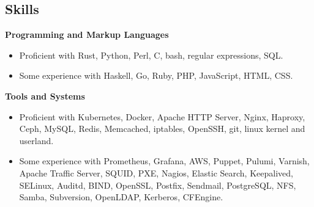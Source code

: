\documentclass[line]{res}
\begin{document}
\begin{resume}
\section{Skills}

\textbf{Programming and Markup Languages}
\begin{itemize}
\item Proficient with Rust, Python, Perl, C, bash, regular expressions, SQL.
\item Some experience with Haskell, Go, Ruby, PHP, JavaScript, HTML, CSS.
\end{itemize}

\textbf{Tools and Systems}
\begin{itemize}
\item Proficient with Kubernetes, Docker, Apache HTTP Server, Nginx, Haproxy, Ceph, MySQL, Redis, Memcached, iptables, OpenSSH, git, linux kernel and userland.
\item Some experience with Prometheus, Grafana, AWS, Puppet, Pulumi, Varnish, Apache Traffic Server, SQUID, PXE, Nagios, Elastic Search, Keepalived, SELinux, Auditd, BIND, OpenSSL, Postfix, Sendmail, PostgreSQL, NFS, Samba, Subversion, OpenLDAP, Kerberos, CFEngine.
\end{itemize}

\end{resume}
\end{document}
